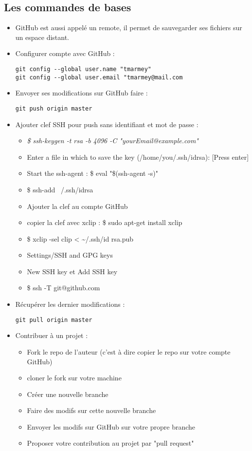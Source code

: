 \documentclass[12pt,a4paper]{article}
\begin{document}
\subsection{Les commandes de bases}
\begin{itemize}
\item GitHub est aussi appelé un remote, il permet de sauvegarder ses fichiers sur un espace distant.
\item Configurer compte avec GitHub :
\begin{lstlisting}
git config --global user.name "tmarmey"
git config --global user.email "tmarmey@mail.com
\end{lstlisting}
\item Envoyer ses modifications sur GitHub faire :
\begin{lstlisting}
git push origin master
\end{lstlisting}
\item Ajouter clef SSH pour push sans identifiant et mot de passe :
\begin{itemize}
\item \textit{\$ ssh-keygen -t rsa -b 4096 -C "yourEmail@example.com"}
\item Enter a file in which to save the key (/home/you/.ssh/id\textunderscore rsa): [Press enter]
\item Start the ssh-agent : \$ eval "\$(ssh-agent -s)"
\item \$ ssh-add ~/.ssh/id\textunderscore rsa
\item Ajouter la clef au compte GitHub
\item copier la clef avec xclip : \$ sudo apt-get install xclip
\item \$ xclip -sel clip < \textasciitilde /.ssh/id \textunderscore rsa.pub
\item Settings/SSH and GPG keys
\item New SSH key et Add SSH key
\item \$ ssh -T git@github.com
\end{itemize}
\item Récupérer les dernier modifications :
\begin{lstlisting}
git pull origin master
\end{lstlisting}
\item Contribuer à un projet :
\begin{itemize}
\item Fork le repo de l'auteur (c'est à dire copier le repo sur votre compte GitHub)
\item cloner le fork sur votre machine
\item Créer une nouvelle branche
\item Faire des modifs sur cette nouvelle branche
\item Envoyer les modifs sur GitHub sur votre propre branche
\item Proposer votre contribution au projet par "pull request"
\end{itemize}
\end{itemize}
\end{document}
